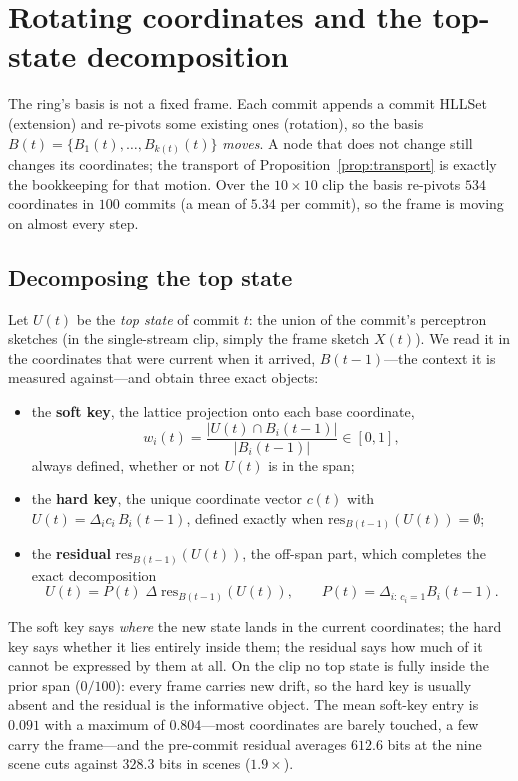 \documentclass[11pt,a4paper]{article}
\theoremstyle{remark}
\newcommand{\xor}{\ensuremath{\Delta}}                %
\newcommand{\res}{\ensuremath{\mathrm{res}}}          %
\begin{document}
\section{Rotating coordinates and the top-state decomposition}
\label{sec:rotating}

The ring's basis is not a fixed frame. Each commit appends a commit HLLSet
(extension) and re-pivots some existing ones (rotation), so the basis
$B(t)=\{B_1(t),\dots,B_{k(t)}(t)\}$ \emph{moves}. A node that does not change
still changes its coordinates; the transport of
Proposition~\ref{prop:transport} is exactly the bookkeeping for that motion.
Over the $10\times10$ clip the basis re-pivots $534$ coordinates in $100$
commits (a mean of $5.34$ per commit), so the frame is moving on almost every
step.

\subsection{Decomposing the top state}

Let $U(t)$ be the \emph{top state} of commit $t$: the union of the commit's
perceptron sketches (in the single-stream clip, simply the frame sketch
$X(t)$). We read it in the coordinates that were current when it arrived,
$B(t{-}1)$---the context it is measured against---and obtain three exact
objects:
\begin{itemize}[leftmargin=*,nosep]
  \item the \textbf{soft key}, the lattice projection onto each base
    coordinate,
    \[
    w_i(t)=\frac{|U(t)\cap B_i(t{-}1)|}{|B_i(t{-}1)|}\in[0,1],
    \]
    always defined, whether or not $U(t)$ is in the span;
  \item the \textbf{hard key}, the unique coordinate vector $c(t)$ with
    $U(t)=\xor_i c_i\,B_i(t{-}1)$, defined exactly when
    $\res_{B(t{-}1)}(U(t))=\emptyset$;
  \item the \textbf{residual} $\res_{B(t{-}1)}(U(t))$, the off-span part, which
    completes the exact decomposition
    \[
    U(t)=P(t)\;\xor\;\res_{B(t{-}1)}(U(t)),
    \qquad
    P(t)=\xor_{i:\,c_i=1} B_i(t{-}1).
    \]
\end{itemize}

The soft key says \emph{where} the new state lands in the current coordinates;
the hard key says whether it lies entirely inside them; the residual says how
much of it cannot be expressed by them at all. On the clip no top state is
fully inside the prior span ($0/100$): every frame carries new drift, so the
hard key is usually absent and the residual is the informative object. The mean
soft-key entry is $0.091$ with a maximum of $0.804$---most coordinates are
barely touched, a few carry the frame---and the pre-commit residual averages
$612.6$ bits at the nine scene cuts against $328.3$ bits in scenes
($1.9\times$).
\end{document}
